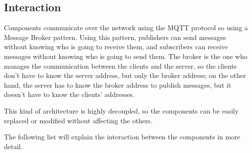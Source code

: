\documentclass{scrartcl}
\begin{document}
\subsection{Interaction}\label{interaction}
Components communicate over the network using the MQTT protocol so using a Message Broker pattern.
Using this pattern, publishers can send messages without knowing who is going to receive them, and
subscribers can receive messages without knowing who is going to send them.
The broker is the one who manages the communication between the clients and the server, so the clients
don't have to know the server address, but only the broker address; on the other hand, the server has
to know the broker address to publish messages, but it doesn't have to know the clients' addresses.

This kind of architecture is highly decoupled, so the components can be easily replaced or modified
without affecting the others.

The following list will explain the interaction between the components in more detail.
\end{document}

